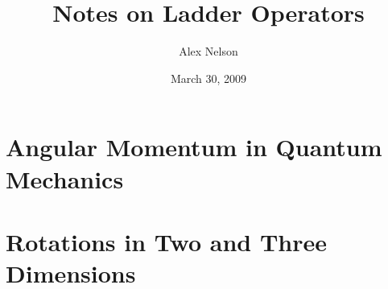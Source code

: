 \documentclass[draft]{amsart}
\title{Notes on Ladder Operators}
\author{Alex Nelson}
\date{March 30, 2009}
\numberwithin{equation}{section}
\begin{document}
\maketitle
\section{Angular Momentum in Quantum Mechanics}

\section{Rotations in Two and Three Dimensions}

\end{document}
